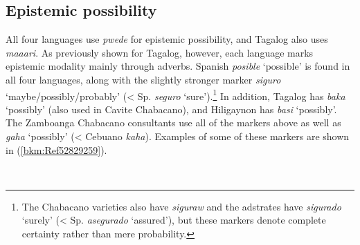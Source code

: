 \subsection{Epistemic possibility}

All four languages use \textit{pwede} for epistemic possibility, and Tagalog also uses \textit{maaari}. As previously shown for Tagalog, however, each language marks epistemic modality mainly through adverbs. Spanish \textit{posible} ‘possible’ is found in all four languages, along with the slightly stronger marker \textit{siguro} ‘maybe/possibly/probably’ (< Sp. \textit{seguro} ‘sure’).\footnote{The Chabacano varieties also have \textit{siguraw} and the adstrates have \textit{sigurado} ‘surely’ (< Sp. \textit{asegurado} ‘assured’), but these markers denote complete certainty rather than mere probability.} In addition, Tagalog has \textit{baka} ‘possibly’ (also used in Cavite Chabacano), and Hiligaynon has \textit{basi} ‘possibly’. The Zamboanga Chabacano consultants use all of the markers above as well as \textit{gaha} ‘possibly’ (< Cebuano \textit{kaha}). Examples of some of these markers are shown in (\ref{bkm:Ref52829259}).

{}\\

